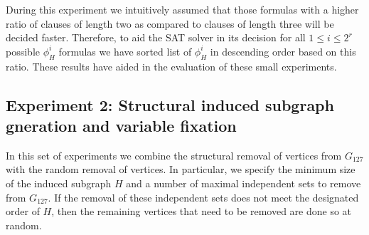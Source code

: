\documentclass[paper=a4, fontsize=11pt]{scrartcl} %
\begin{document}

During this experiment we intuitively assumed that those formulas with a 
higher ratio of clauses of length two as compared to clauses of length 
three will be decided faster. Therefore, to aid the SAT solver in its
decision for all $1 \leq i \leq 2^{r}$ possible $\phi_H^i$ formulas
we have sorted list of $\phi_H^i$ in descending order based on this ratio. 
These results have aided in the evaluation of these small experiments. 


\subsection{Experiment 2: Structural induced subgraph gneration and variable fixation}
In this set of experiments we combine the structural removal of vertices from $G_{127}$
with the random removal of vertices. In particular, we specify the minimum size of 
the induced subgraph $H$ and a number of maximal independent sets to remove from $G_{127}$.
If the removal of these independent sets does not meet the designated order of $H$,
then the remaining vertices that need to be removed are done so at random. 
\end{document}

